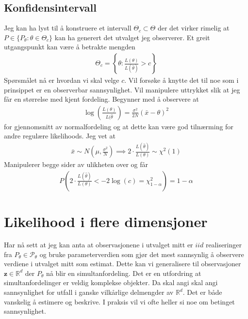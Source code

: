 \subsection{Konfidensintervall}
Jeg kan ha lyst til å konstruere et intervall $\Theta_c \subset \Theta$ der det virker rimelig at $P \in \{P_{\theta}:\theta \in \Theta_c\}$ kan ha generert det utvalget jeg observerer. Et greit utgangspunkt kan være å betrakte mengden
\begin{align}
\Theta_c = \left\{ \theta : \frac{L(\theta)}{L(\hat{\theta})} > c \right\}
\end{align}
Spørsmålet nå er hvordan vi skal velge $c$. Vil forsøke å knytte det til noe som i prinsippet er en observerbar sannsynlighet. Vil manipulere uttrykket slik at jeg får en størrelse med kjent fordeling. Begynner med å observere at
\begin{align}
\log \left(\frac{L(\theta)}{L(\hat{\theta}}\right) = \frac{\sigma^2}{2N}(\bar{x}-\theta)^2
\end{align}
for gjennomsnitt av normalfordeling og at dette kan være god tilnærming for andre regulære likelihoods. Jeg vet at 
\begin{align}
\bar{x} \sim N\left(\mu,\frac{\sigma^2}{N}\right) \implies 2\cdot \frac{L(\hat{\theta})}{L(\theta)} \sim \chi^2(1)
\end{align}
Manipulerer begge sider av ulikheten over og får
\begin{align}
P\left(2\cdot \frac{L(\hat{\theta})}{L(\theta)}<-2\log(c) = \chi^2_{1-\alpha}\right) = 1-\alpha
\end{align}
\section{Likelihood i flere dimensjoner}
Har nå sett at jeg kan anta at observasjonene i utvalget mitt er $iid$ realiseringer fra $P_{\theta} \in \mathscr{P}_{\theta}$ og bruke parameterverdien som gjør det mest sannsynlig å observere verdiene i utvalget mitt som estimat. Dette kan vi generalisere til observasjoner $\mathbf{z} \in \mathbb{R}^d$ der $P_{\theta}$ nå blir en simultanfordeling. Det er en utfordring at simultanfordelinger er veldig komplekse objekter. Da skal angi skal angi sannsynlighet for utfall i ganske vilkårlige delmengder av $\mathbb{R}^d$. Det er både vanskelig å estimere og beskrive. I praksis vil vi ofte heller si noe om betinget sannsynlighet.
